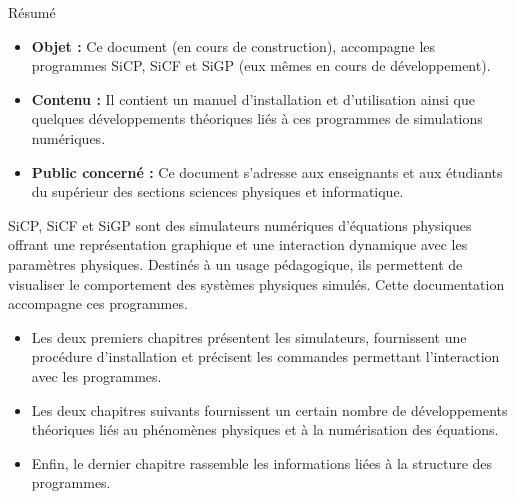 \begin{center}
\Large
Résumé
\normalsize
\end{center}
\vspace{3cm}
\begin{itemize}[leftmargin=1cm, label=, itemsep=21pt]
\item {\bf Objet : }Ce document (en cours de construction), accompagne les programmes SiCP, SiCF et SiGP (eux mêmes en cours de développement).
\item {\bf Contenu : }Il contient un manuel d'installation et d'utilisation ainsi que quelques développements théoriques liés à ces programmes de simulations numériques.
\item {\bf Public concerné : }Ce document s'adresse aux enseignants et aux étudiants du supérieur des sections sciences physiques et informatique.
\end{itemize}

\vspace{3cm}

SiCP, SiCF et SiGP sont des simulateurs numériques d'équations physiques offrant une représentation graphique et une interaction dynamique avec les paramètres physiques. Destinés à un usage pédagogique, ils permettent de visualiser le comportement des systèmes physiques simulés. Cette documentation accompagne ces programmes.

\begin{itemize}[leftmargin=1cm, label=, itemsep=11pt]
\item Les deux premiers chapitres présentent les simulateurs, fournissent une procédure d'installation et précisent les commandes permettant l'interaction avec les programmes.
\item Les deux chapitres suivants fournissent un certain nombre de développements théoriques liés au phénomènes physiques et à la numérisation des équations.
\item Enfin, le dernier chapitre rassemble les informations liées à la structure des programmes.
\end{itemize}
